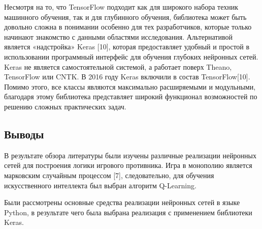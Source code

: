 Несмотря на то, что TensorFlow подходит как для широкого набора техник машинного обучения, так и для глубинного обучения, библиотека может быть довольно сложна в понимании особенно для тех разработчиков, которые только начинают знакомство с данными областями исследования. Альтернативой является «надстройка» Keras [10], которая предоставляет удобный и простой в использовании программный интерфейс для обучения глубоких нейронных сетей. Keras не является самостоятельной системой, а работает поверх Theano, TensorFlow или CNTK. В 2016 году Keras включили в состав TensorFlow[10]. Помимо этого, все классы являются максимально расширяемыми и модульными, благодаря этому библиотека представляет широкий функционал возможностей по решению сложных практических задач.
\subsection*{Выводы}
В результате обзора литературы были изучены различные реализации нейронных сетей для построения логики игрового противника. Игра в монополию является марковским случайным процессом [7], следовательно, для обучения искусственного интеллекта был выбран алгоритм Q-Learning.

Были рассмотрены основные средства реализации нейронных сетей в языке Python, в результате чего была выбрана реализация с применением библиотеки Keras.
